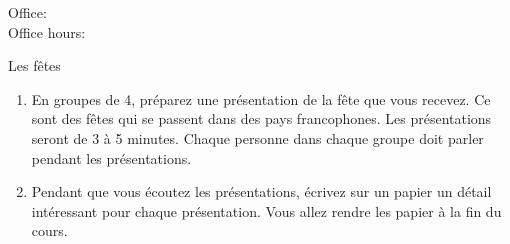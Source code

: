 \documentclass{beamer}
\subtitle[Expression orale]{Atelier d'expression orale}
\begin{document}
  \begin{frame}
    \titlepage
    \tiny{Office: \\
          Office hours: }
  \end{frame}

  \begin{frame}{Les fêtes}
    \begin{enumerate}
      \item 
        En groupes de 4, préparez une présentation de la fête que vous recevez.
        Ce sont des fêtes qui se passent dans des pays francophones.
        Les présentations seront de 3 à 5 minutes.
        \alert{Chaque personne} dans chaque groupe \alert{doit parler} pendant les présentations.
      \item
        Pendant que vous écoutez les présentations, écrivez sur un papier un détail intéressant pour chaque présentation.
        Vous allez rendre les papier à la fin du cours.
    \end{enumerate}
  \end{frame}
\end{document}
